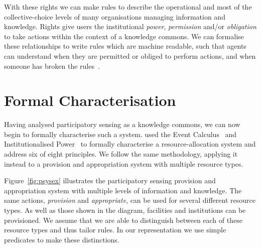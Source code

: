 With these rights we can make rules to describe the operational and most of the collective-choice levels of many organisations managing information and knowledge. Rights give users the institutional \emph{power}, \emph{permission} and/or \emph{obligation} to take actions within the context of a knowledge commons. We can formalise these relationships to write rules which are machine readable, such that agents can understand when they are permitted or obliged to perform actions, and when someone has broken the rules~\citep{Artikis2011}.



\section{Formal Characterisation}

Having analysed participatory sensing as a knowledge commons, we can now begin to formally characterise such a system.  used the Event Calculus~\citep{Kowalski1986} and Institutionalised Power~\citep{Jones1996} to formally characterise a resource-allocation system and address six of  eight principles. We follow the same methodology, applying it instead to a provision and appropriation system with multiple resource types.

Figure~\ref{fig:psysex} illustrates the participatory sensing provision and appropriation system with multiple levels of information and knowledge. 
The same actions, \emph{provision} and \emph{appropriate}, can be used for several different resource types. 
As well as those shown in the diagram, facilities and institutions can be provisioned. 
We assume that we are able to distinguish between each of these resource types and thus tailor rules. In our representation we use simple predicates to make these distinctions.

